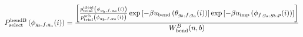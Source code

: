 \documentclass[12pt]{article}
\begin{document}
\begin{displaymath}
P_{\rm select}^{\rm bend B}\left(\phi_{g_b,f,g_a}(i)\right) = 
{{
\left[
{{p_{\rm trial}^{\rm ideal}\left(\phi_{g_b,f,g_a}(i)\right)}\over{ p_{\rm trial}^{\rm arb}\left(\phi_{g_b,f,g_a}(i)\right)}}
\exp\left[-\beta u_{\rm bend}\left(\theta_{g_b,f,g_a}(i)\right)\right]
\exp\left[-\beta u_{\rm imp}\left(\phi_{f,g_a,g_b,p}(i)\right)\right]
\right]
}
\over
{
W_{\rm bend}^{B}(n,b)
}}
\end{displaymath}
\end{document}
